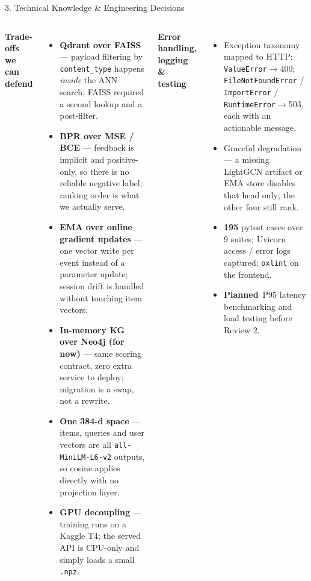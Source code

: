 \documentclass[aspectratio=169, 11pt]{beamer}
\newcommand{\sPLN}{\textcolor{amritaSlate}{\textbf{Planned}}}
\begin{document}
\begin{frame}{3. Technical Knowledge \& Engineering Decisions}
\begin{columns}[T]
{\scriptsize \textbf{Trade-offs we can defend}}
\begin{itemize}\tiny
  \item \textbf{Qdrant over FAISS} --- payload filtering by \texttt{content\_type} happens \emph{inside} the ANN search; FAISS required a second lookup and a post-filter.
  \item \textbf{BPR over MSE / BCE} --- feedback is implicit and positive-only, so there is no reliable negative label; ranking order is what we actually serve.
  \item \textbf{EMA over online gradient updates} --- one vector write per event instead of a parameter update; session drift is handled without touching item vectors.
  \item \textbf{In-memory KG over Neo4j (for now)} --- same scoring contract, zero extra service to deploy; migration is a swap, not a rewrite.
  \item \textbf{One 384-d space} --- items, queries and user vectors are all \texttt{all-MiniLM-L6-v2} outputs, so cosine applies directly with no projection layer.
  \item \textbf{GPU decoupling} --- training runs on a Kaggle T4; the served API is CPU-only and simply loads a small \texttt{.npz}.
\end{itemize}
\vspace{0.5mm}
{\scriptsize \textbf{Error handling, logging \& testing}}
\begin{itemize}\tiny
  \item Exception taxonomy mapped to HTTP: \texttt{ValueError}$\rightarrow$400; \texttt{FileNotFoundError} / \texttt{ImportError} / \texttt{RuntimeError}$\rightarrow$503, each with an actionable message.
  \item Graceful degradation --- a missing LightGCN artifact or EMA store disables that head only; the other four still rank.
  \item \textbf{195} pytest cases over 9 suites; Uvicorn access / error logs captured; \texttt{oxlint} on the frontend.
  \item \sPLN\ P95 latency benchmarking and load testing before Review 2.
\end{itemize}
\end{columns}
\end{frame}

\end{document}
